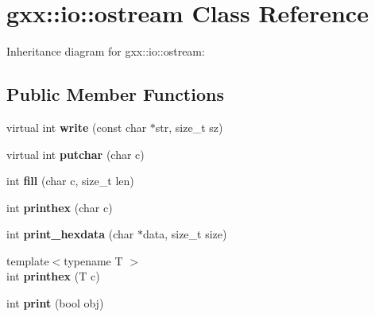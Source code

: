 \hypertarget{classgxx_1_1io_1_1ostream}{}\section{gxx\+:\+:io\+:\+:ostream Class Reference}
\label{classgxx_1_1io_1_1ostream}


Inheritance diagram for gxx\+:\+:io\+:\+:ostream\+:
\subsection*{Public Member Functions}
\begin{DoxyCompactItemize}
\item 
virtual int {\bfseries write} (const char $\ast$str, size\+\_\+t sz)\hypertarget{classgxx_1_1io_1_1ostream_a080bd8ef24cee5888f369f44b522fc2b}{}\label{classgxx_1_1io_1_1ostream_a080bd8ef24cee5888f369f44b522fc2b}

\item 
virtual int {\bfseries putchar} (char c)\hypertarget{classgxx_1_1io_1_1ostream_a0a598ff7dcd1adfa3efd219db280a265}{}\label{classgxx_1_1io_1_1ostream_a0a598ff7dcd1adfa3efd219db280a265}

\item 
int {\bfseries fill} (char c, size\+\_\+t len)\hypertarget{classgxx_1_1io_1_1ostream_a4f6d6026d9a95c4b05e29b130bc9bf51}{}\label{classgxx_1_1io_1_1ostream_a4f6d6026d9a95c4b05e29b130bc9bf51}

\item 
int {\bfseries printhex} (char c)\hypertarget{classgxx_1_1io_1_1ostream_a784fe5bed234ef371170cdf9e3094a1f}{}\label{classgxx_1_1io_1_1ostream_a784fe5bed234ef371170cdf9e3094a1f}

\item 
int {\bfseries print\+\_\+hexdata} (char $\ast$data, size\+\_\+t size)\hypertarget{classgxx_1_1io_1_1ostream_a943c6de1d28bd81236f61eaf2f002712}{}\label{classgxx_1_1io_1_1ostream_a943c6de1d28bd81236f61eaf2f002712}

\item 
{\footnotesize template$<$typename T $>$ }\\int {\bfseries printhex} (T c)\hypertarget{classgxx_1_1io_1_1ostream_a823da81125ba83ea267132db0791e49a}{}\label{classgxx_1_1io_1_1ostream_a823da81125ba83ea267132db0791e49a}

\item 
int {\bfseries print} (bool obj)\hypertarget{classgxx_1_1io_1_1ostream_a2338c8cca2d465249875b81475a7cb6d}{}\label{classgxx_1_1io_1_1ostream_a2338c8cca2d465249875b81475a7cb6d}


\end{DoxyCompactItemize}
